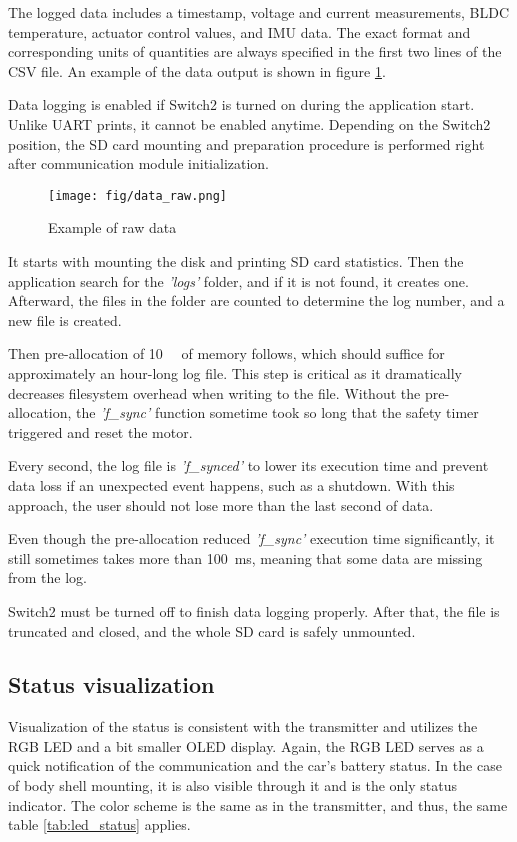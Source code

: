 The logged data includes a timestamp, voltage and current measurements, BLDC temperature, actuator control values, and IMU data. The exact format and corresponding units of quantities are always specified in the first two lines of the CSV file. An example of the data output is shown in figure \ref{fig:data_raw}.

Data logging is enabled if Switch2 is turned on during the application start. Unlike UART prints, it cannot be enabled anytime. Depending on the Switch2 position, the SD card mounting and preparation procedure is performed right after communication module initialization.
\begin{figure}[h]
\centering
\texttt{[image: fig/data\_raw.png]}
\caption{Example of raw data}
\label{fig:data_raw}
\end{figure}

It starts with mounting the disk and printing SD card statistics. Then the application search for the \textit{'logs'} folder, and if it is not found, it creates one. Afterward, the files in the folder are counted to determine the log number, and a new file is created.

Then pre-allocation of \SI{10}{\mebi\byte} of memory follows, which should suffice for approximately an \mbox{hour-long} log file. This step is critical as it dramatically decreases filesystem overhead when writing to the file. Without the pre-allocation, the \textit{'f\_sync'} function sometime took so long that the safety timer triggered and reset the motor.

Every second, the log file is \textit{'f\_synced'} to lower its execution time and prevent data loss if an unexpected event happens, such as a shutdown. With this approach, the user should not lose more than the last second of data.

Even though the pre-allocation reduced \textit{'f\_sync'} execution time significantly, it still sometimes takes more than \SI{100}{\ms}, meaning that some data are missing from the log.

Switch2 must be turned off to finish data logging properly. After that, the file is truncated and closed, and the whole SD card is safely unmounted.


\subsection{Status visualization}
Visualization of the status is consistent with the transmitter and utilizes the RGB LED and a bit smaller OLED display. Again, the RGB LED serves as a quick notification of the communication and the car's battery status. In the case of body shell mounting, it is also visible through it and is the only status indicator. The color scheme is the same as in the transmitter, and thus, the same table \ref{tab:led_status} applies.

